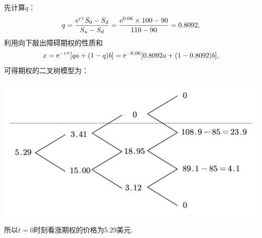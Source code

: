 \begin{enumerate}
    先计算$q$：
    \[q = \frac{\mathrm{e}^{r\tau}S_0 - S_d}{S_u - S_d} = \frac{\mathrm{e}^{0.06}\times 100-90}{110-90}=0.8092,\]
    利用向下敲出障碍期权的性质和
    \[x = \mathrm{e}^{-r\tau}[qa+(1-q)b]=\mathrm{e}^{-0.06}[0.8092a+(1-0.8092)b],\]
    可得期权的二叉树模型为：
    \begin{center}
        \includegraphics[scale=0.35]{CH3-4-3.pdf}
    \end{center}
    所以$t=0$时刻看涨期权的价格为5.29美元.
\end{enumerate}

